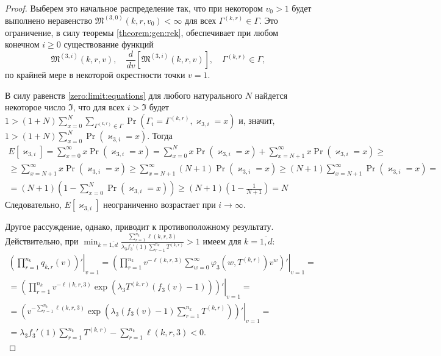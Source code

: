 \documentclass[a4paper,12pt,russian]{extarticle}
\begin{document}
\begin{proof}
Выберем это начальное распределение так, что при некотором $v_0 >1$  будет выполнено неравенство $\mathfrak{M}^{(3,0)}(k,r,v_0) <\infty$ для всех $\Gamma^{(k,r)}\in \Gamma$. Это ограничение, в силу теоремы \eqref{theorem:gen:rek}, обеспечивает при любом конечном $i\geqslant 0$ существование функций 
\begin{equation}
\mathfrak{M}^{(3,i)}(k,r,v),\quad \frac{d}{dv} \left[\mathfrak{M}^{(3,i)}(k,r,v)\right], \quad \Gamma^{(k,r)} \in \Gamma,
\end{equation}
по крайней мере в некоторой окрестности точки $v=1$.

В силу равенств \eqref{zero:limit:equations} для любого натурального $N$ найдется некоторое число $\mathfrak{I}$, что для всех $i > \mathfrak{I}$ будет
$1 > (1+N) \sum_{x=0}^{N} \sum_{\Gamma^{(k,r)}\in \Gamma}  \Pr(\Gamma_{i}=\Gamma^{(k,r)}, \varkappa_{3,i}=x)$ и, значит, $1 > (1+N) \sum_{x=0}^{N}  \Pr(\varkappa_{3,i}=x)$. Тогда
\begin{multline*}
E[\varkappa_{3,i}] = \sum_{x=0}^{\infty} x \Pr(\varkappa_{3,i}=x) = \sum_{x=0}^{N} x \Pr(\varkappa_{3,i}=x) + \sum_{x=N+1}^{\infty} x \Pr(\varkappa_{3,i}=x) \geqslant \\ \geqslant  \sum_{x=N+1}^{\infty} x \Pr(\varkappa_{3,i}=x) \geqslant \sum_{x=N+1}^{\infty} (N+1)
\Pr(\varkappa_{3,i}=x) \geqslant (N+1) \sum_{x=N+1}^{\infty} \Pr( \varkappa_{3,i}=x) =\\ =  (N+1) \left(1 - \sum_{x=0}^{N} \Pr(\varkappa_{3,i}=x)\right) \geqslant (N+1) \left(1 - \frac{1}{N+1}\right) = N
\end{multline*}
Следовательно, $E[\varkappa_{3,i}]$ неограниченно возрастает при $i \to \infty$. 

Другое рассуждение, однако, приводит к противоположному результату. Действительно, при $\min_{k=\overline{1,d}} { \frac{\sum_{r = 1}^{n_k} \ell(k,r,3) }{\lambda_3 f_3'(1) \sum_{r=1}^{n_k} T^{(k,r)} }}>1$ имеем для $k=\overline{1,d}$:
\begin{multline}
 \left.\left(\prod_{r=1}^{n_k}q_{k,r}(v)\right) ' \right|_{v=1} = 
  \left.\left(\prod_{r=1}^{n_k}v^{-\ell(k,r,3)}\sum_{w=0}^{\infty} \varphi_3(w,T^{(k,r)})v^w \right) ' \right|_{v=1} = \\ =
   \left.\left(\prod_{r=1}^{n_k} v^{-\ell(k,r,3)}\exp(\lambda_3 T^{(k,r)} (f_3(v)-1))\right) ' \right|_{v=1} = \\ =
    \left.\left(v^{-\sum_{r=1}^{n_k}\ell(k,r,3)}\exp(\lambda_3 (f_3(v)-1)\sum_{r=1}^{n_k} T^{(k,r)}) \right) ' \right|_{v=1} = \\ =
\lambda_3 f_3'(1) \sum_{r=1}^{n_k} T^{(k,r)} -\sum_{r=1}^{n_k} \ell(k,r,3)  < 0.
\label{derivative:cycle}
\end{multline}


\end{proof}
\end{document}
